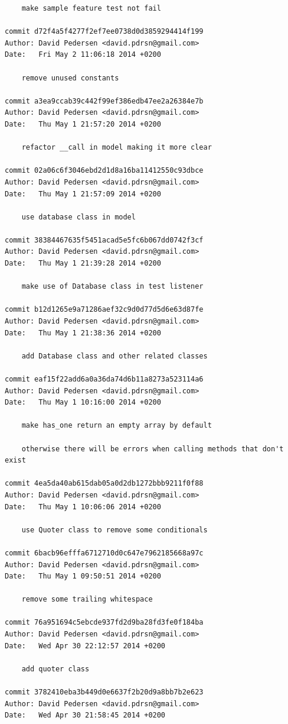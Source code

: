\documentclass[12pt]{article}
\begin{document}
\begin{verbatim}
    make sample feature test not fail

commit d72f4a5f4277f2ef7ee0738d0d3859294414f199
Author: David Pedersen <david.pdrsn@gmail.com>
Date:   Fri May 2 11:06:18 2014 +0200

    remove unused constants

commit a3ea9ccab39c442f99ef386edb47ee2a26384e7b
Author: David Pedersen <david.pdrsn@gmail.com>
Date:   Thu May 1 21:57:20 2014 +0200

    refactor __call in model making it more clear

commit 02a06c6f3046ebd2d1d8a16ba11412550c93dbce
Author: David Pedersen <david.pdrsn@gmail.com>
Date:   Thu May 1 21:57:09 2014 +0200

    use database class in model

commit 38384467635f5451acad5e5fc6b067dd0742f3cf
Author: David Pedersen <david.pdrsn@gmail.com>
Date:   Thu May 1 21:39:28 2014 +0200

    make use of Database class in test listener

commit b12d1265e9a71286aef32c9d0d77d5d6e63d87fe
Author: David Pedersen <david.pdrsn@gmail.com>
Date:   Thu May 1 21:38:36 2014 +0200

    add Database class and other related classes

commit eaf15f22add6a0a36da74d6b11a8273a523114a6
Author: David Pedersen <david.pdrsn@gmail.com>
Date:   Thu May 1 10:16:00 2014 +0200

    make has_one return an empty array by default
    
    otherwise there will be errors when calling methods that don't exist

commit 4ea5da40ab615dab05a0d2db1272bbb9211f0f88
Author: David Pedersen <david.pdrsn@gmail.com>
Date:   Thu May 1 10:06:06 2014 +0200

    use Quoter class to remove some conditionals

commit 6bacb96efffa6712710d0c647e7962185668a97c
Author: David Pedersen <david.pdrsn@gmail.com>
Date:   Thu May 1 09:50:51 2014 +0200

    remove some trailing whitespace

commit 76a951694c5ebcde937fd2d9ba28fd3fe0f184ba
Author: David Pedersen <david.pdrsn@gmail.com>
Date:   Wed Apr 30 22:12:57 2014 +0200

    add quoter class

commit 3782410eba3b449d0e6637f2b20d9a8bb7b2e623
Author: David Pedersen <david.pdrsn@gmail.com>
Date:   Wed Apr 30 21:58:45 2014 +0200


\end{verbatim}
\end{document}
